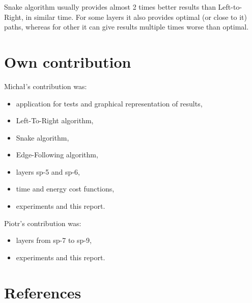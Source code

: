 \documentclass[]{article}
\begin{document}
Snake algorithm usually provides almost 2 times better results than Left-to-Right, in similar time. For some layers it also provides optimal (or close to it) paths, whereas for other it can give results multiple times worse than optimal.

\section{Own contribution}
Michał's contribution was:
\begin{itemize}
\item application for tests and graphical representation of results,
\item Left-To-Right algorithm,
\item Snake algorithm,
\item Edge-Following algorithm,
\item layers sp-5 and sp-6,
\item time and energy cost functions,
\item experiments and this report.
\end{itemize}

Piotr's contribution was:
\begin{itemize}
\item layers from sp-7 to sp-9,
\item experiments and this report. 
\end{itemize}

\section{References}
\end{document}
